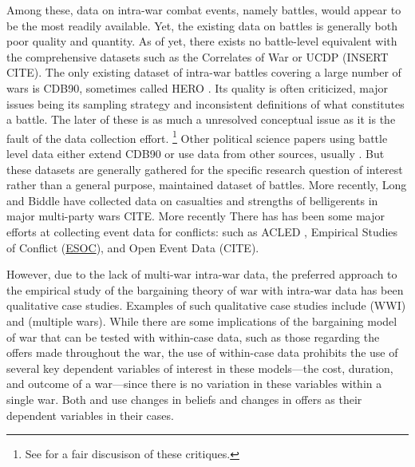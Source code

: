 Among these, data on intra-war combat events, namely battles, would appear to be the most readily available.
Yet, the existing data on battles is generally both poor quality and quantity.
As of yet, there exists no battle-level equivalent with the comprehensive datasets such as the Correlates of War \parencite{SarkeesWayman2010} or UCDP (INSERT CITE).
The only existing dataset of intra-war battles covering a large number of wars is CDB90, sometimes called HERO \parencite{cdb90}.
Its quality is often criticized, major issues being its sampling strategy and inconsistent definitions of what constitutes a battle.
The later of these is as much a unresolved conceptual issue as it is the fault of the data collection effort.%
\footnote{See \textcite{BiddleLong2004} for a fair discusison of these critiques.}
Other political science papers using battle level data either extend CDB90 or use data from other sources, usually \textcite{Clodfelter2008}.
But these datasets are generally gathered for the specific research question of interest rather than a general purpose, maintained dataset of battles.
More recently, Long and Biddle have collected data on casualties and strengths of belligerents in major multi-party wars CITE.
More recently There has has been some major efforts at collecting event data for conflicts:
such as ACLED \parencites{RaleighLinkeHegreEtAl2010}, Empirical Studies of Conflict (\href{http://esoc.princeton.edu/}{ESOC}), and Open Event Data (CITE).

However, due to the lack of multi-war intra-war data, the preferred approach to the empirical study of the bargaining theory of war with intra-war data has been qualitative case studies\parencites{Reiter2003}[][Chapter 9]{Reiter2009}.
Examples of such qualitative case studies include  \textcite{Goemans2000} (WWI) and \textcite{Reiter2009} (multiple wars).
While there are some implications of the bargaining model of war that can be tested with within-case data, such as those regarding the offers made throughout the war, the use of within-case data prohibits the use of several key dependent variables of interest in these models---the cost, duration, and outcome of a war---since there is no variation in these variables within a single war.
Both \textcite{Reiter2009} and \textcite{Goemans2000} use changes in beliefs and changes in offers as their dependent variables in their cases.


